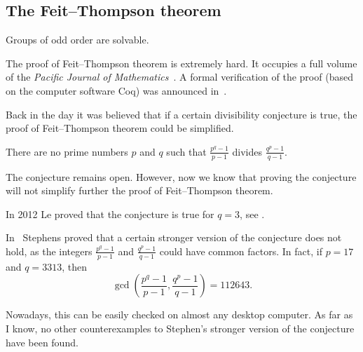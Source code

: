 \subsection{The Feit--Thompson theorem}

\begin{theorem}
    Groups of odd order are solvable. 
\end{theorem}

The proof of Feit--Thompson theorem is extremely hard. 
It occupies a full volume of the 
\emph{Pacific Journal of Mathematics}~\cite{MR166261}. 
A formal verification of the proof 
(based on the computer software Coq) 
was announced in~\cite{MR3111271}.  

\begin{optional}
    
Back in the day it was believed that if a certain divisibility 
conjecture is true, 
the proof of Feit--Thompson theorem 
could be simplified. 

\begin{conj}
    There are no prime numbers $p$ and $q$ such that
    $\frac {p^{q}-1}{p-1}$ divides $\frac{q^{p} - 1}{q - 1}$. 
\end{conj}

The conjecture remains open. However, now we know that 
proving the conjecture will not simplify further
the proof of Feit--Thompson theorem. 

In 2012 Le proved that the conjecture is true for $q=3$, see 
\cite{MR2900154}. 


In~\cite{MR297686} 
Stephens proved that a certain stronger version of the conjecture 
does not hold, as the integers 
$\frac {p^{q}-1}{p-1}$ and $\frac{q^{p} - 1}{q - 1}$ 
could have common factors. In fact, if $p=17$ and $q=3313$, 
then 
\[
\gcd\left(\frac {p^{q}-1}{p-1},\frac{q^{p} - 1}{q - 1}\right)=112643.
\]

Nowadays, this can be easily checked on almost any desktop computer. 
As far as I know, no other counterexamples to Stephen’s stronger version of the conjecture have been found.

\end{optional}



